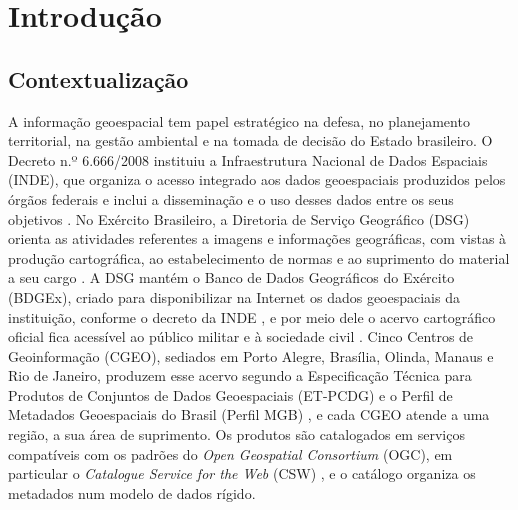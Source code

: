 \chapter{Introdução}
\label{cap:introducao}

\section{Contextualização}
\label{sec:contextualizacao}

A informação geoespacial tem papel estratégico na defesa, no planejamento territorial, na gestão ambiental e na tomada de decisão do Estado brasileiro. O Decreto n.º 6.666/2008 instituiu a Infraestrutura Nacional de Dados Espaciais (INDE), que organiza o acesso integrado aos dados geoespaciais produzidos pelos órgãos federais e inclui a disseminação e o uso desses dados entre os seus objetivos \cite{inde2010decreto}. No Exército Brasileiro, a Diretoria de Serviço Geográfico (DSG) orienta as atividades referentes a imagens e informações geográficas, com vistas à produção cartográfica, ao estabelecimento de normas e ao suprimento do material a seu cargo \cite{dsg2024missao}. A DSG mantém o Banco de Dados Geográficos do Exército (BDGEx), criado para disponibilizar na Internet os dados geoespaciais da instituição, conforme o decreto da INDE \cite{xavier2014bdgex}, e por meio dele o acervo cartográfico oficial fica acessível ao público militar e à sociedade civil \cite{bdgex2024}. Cinco Centros de Geoinformação (CGEO), sediados em Porto Alegre, Brasília, Olinda, Manaus e Rio de Janeiro, produzem esse acervo segundo a Especificação Técnica para Produtos de Conjuntos de Dados Geoespaciais (ET-PCDG) \cite{etpcdg2016} e o Perfil de Metadados Geoespaciais do Brasil (Perfil MGB) \cite{perfilmgb2009}, e cada CGEO atende a uma região, a sua área de suprimento. Os produtos são catalogados em serviços compatíveis com os padrões do \textit{Open Geospatial Consortium} (OGC), em particular o \textit{Catalogue Service for the Web} (CSW) \cite{ogccsw2007}, e o catálogo organiza os metadados num modelo de dados rígido.

